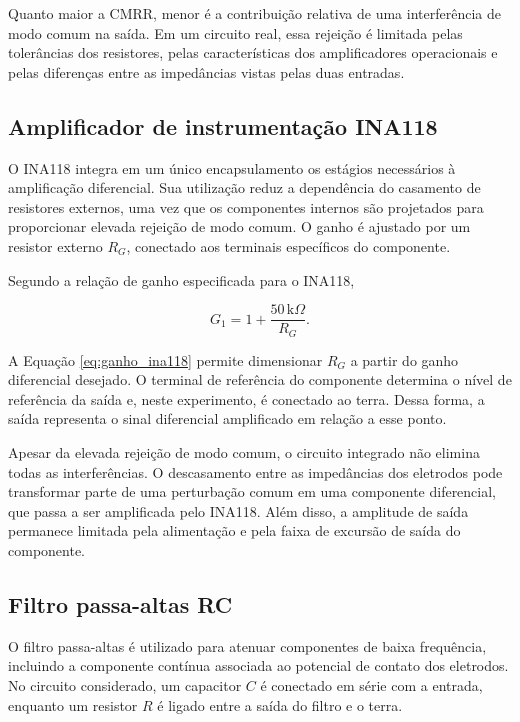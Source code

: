 \documentclass[11pt,a4paper]{article}
\begin{document}
Quanto maior a CMRR, menor é a contribuição relativa de uma interferência de modo comum na saída. Em um circuito real, essa rejeição é limitada pelas tolerâncias dos resistores, pelas características dos amplificadores operacionais e pelas diferenças entre as impedâncias vistas pelas duas entradas.

\subsection{Amplificador de instrumentação INA118}

O INA118 integra em um único encapsulamento os estágios necessários à amplificação diferencial. Sua utilização reduz a dependência do casamento de resistores externos, uma vez que os componentes internos são projetados para proporcionar elevada rejeição de modo comum. O ganho é ajustado por um resistor externo $R_G$, conectado aos terminais específicos do componente.

Segundo a relação de ganho especificada para o INA118,

\begin{equation}
G_1=1+\frac{50\,\mathrm{k}\Omega}{R_G}.
\label{eq:ganho_ina118}
\end{equation}

A Equação \ref{eq:ganho_ina118} permite dimensionar $R_G$ a partir do ganho diferencial desejado. O terminal de referência do componente determina o nível de referência da saída e, neste experimento, é conectado ao terra. Dessa forma, a saída representa o sinal diferencial amplificado em relação a esse ponto.

Apesar da elevada rejeição de modo comum, o circuito integrado não elimina todas as interferências. O descasamento entre as impedâncias dos eletrodos pode transformar parte de uma perturbação comum em uma componente diferencial, que passa a ser amplificada pelo INA118. Além disso, a amplitude de saída permanece limitada pela alimentação e pela faixa de excursão de saída do componente.

\subsection{Filtro passa-altas RC}

O filtro passa-altas é utilizado para atenuar componentes de baixa frequência, incluindo a componente contínua associada ao potencial de contato dos eletrodos. No circuito considerado, um capacitor $C$ é conectado em série com a entrada, enquanto um resistor $R$ é ligado entre a saída do filtro e o terra.
\end{document}
